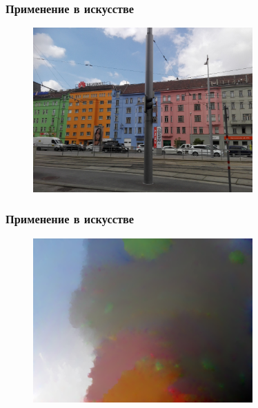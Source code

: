 \documentclass[aspectratio=169]{beamer}
\begin{document}
\begin{frame}
  \frametitle{Применение в искусстве}
  \begin{figure}
    \centering
    \includegraphics[width=0.75\textwidth]{street-before.png}
  \end{figure}
\end{frame}

\begin{frame}
  \frametitle{Применение в искусстве}
  \begin{figure}
    \centering
    \includegraphics[width=0.75\textwidth]{street-after.png}
  \end{figure}
\end{frame}
\end{document}
